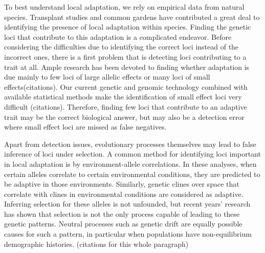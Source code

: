 To best understand local adaptation, we rely on empirical data from natural species. Transplant studies and common gardens have contributed a great deal to identifying the presence of local adaptation within species. Finding the genetic loci that contribute to this adaptation is a complicated endeavor. Before considering the difficulties due to identifying the correct loci instead of the incorrect ones, there is a first problem that is detecting loci contributing to a trait at all. Ample research has been devoted to finding whether adaptation is due mainly to few loci of large allelic effects or many loci of small effects(\color{red}citations\color{black}). Our current genetic and genomic technology combined with available statistical methods make the identification of small effect loci very difficult (\color{red}citations\color{black}). Therefore, finding few loci that contribute to an adaptive trait may be the correct biological answer, but may also be a detection error where small effect loci are missed as false negatives.

Apart from detection issues, evolutionary processes themselves may lead to false inference of loci under selection. A common method for identifying loci important in local adaptation is by environment-allele correlations. In these analyses, when certain alleles correlate to certain environmental conditions, they are predicted to be adaptive in those environments. Similarly, genetic clines over space that correlate with clines in environmental conditions are considered as adaptive. Inferring selection for these alleles is not unfounded, but recent years' research has shown that selection is not the only process capable of leading to these genetic patterns. Neutral processes such as genetic drift are equally possible causes for such a pattern, in particular when populations have non-equilibrium demographic histories. (\color{red}citations for this whole paragraph\color{black})

